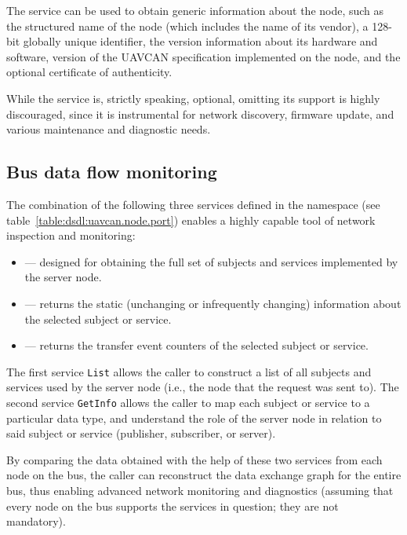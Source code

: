 The service  can be used to obtain generic information about the node,
such as the structured name of the node (which includes the name of its vendor),
a 128-bit globally unique identifier, the version information about its hardware and software,
version of the UAVCAN specification implemented on the node, and the optional certificate of authenticity.

While the service is, strictly speaking, optional, omitting its support is highly discouraged,
since it is instrumental for network discovery, firmware update, and various maintenance and diagnostic needs.


\subsection{Bus data flow monitoring}

The combination of the following three services defined in the namespace 
(see table~\ref{table:dsdl:uavcan.node.port}) enables a highly capable tool of network inspection and monitoring:
\begin{itemize}
    \item {} --- designed for obtaining the full set of subjects and services
          implemented by the server node.

    \item {} --- returns the static (unchanging or infrequently changing)
          information about the selected subject or service.

    \item {} --- returns the transfer event counters of
          the selected subject or service.
\end{itemize}

The first service \verb|List| allows the caller to construct a list of all subjects and services used by the
server node (i.e., the node that the request was sent to).
The second service \verb|GetInfo| allows the caller to map each subject or service to a particular data type,
and understand the role of the server node in relation to said subject or service
(publisher, subscriber, or server).

By comparing the data obtained with the help of these two services from each node on the bus,
the caller can reconstruct the data exchange graph for the entire bus,
thus enabling advanced network monitoring and diagnostics
(assuming that every node on the bus supports the services in question; they are not mandatory).

